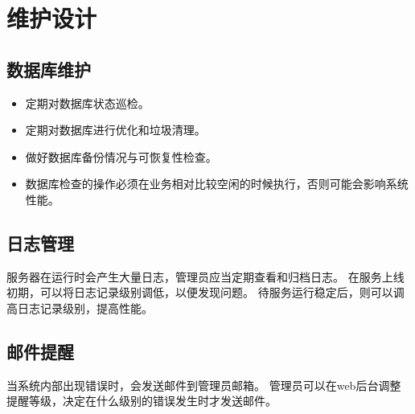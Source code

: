 \chapter{维护设计}

\section{数据库维护}
\begin{itemize}
    \item 定期对数据库状态巡检。
    \item 定期对数据库进行优化和垃圾清理。
    \item 做好数据库备份情况与可恢复性检查。
    \item 数据库检查的操作必须在业务相对比较空闲的时候执行，否则可能会影响系统性能。
    \end{itemize}

\section{日志管理}
服务器在运行时会产生大量日志，管理员应当定期查看和归档日志。
在服务上线初期，可以将日志记录级别调低，以便发现问题。
待服务运行稳定后，则可以调高日志记录级别，提高性能。


\section{邮件提醒}
当系统内部出现错误时，会发送邮件到管理员邮箱。
管理员可以在web后台调整提醒等级，决定在什么级别的错误发生时才发送邮件。
